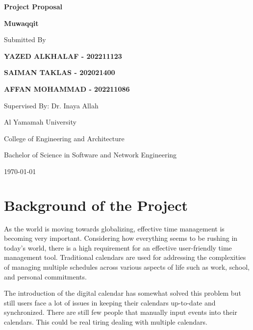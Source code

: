 \documentclass[12pt,a4paper]{article}
\begin{document}
\begin{titlepage}
\begin{center}
\vspace*{2cm}
{\huge\bfseries Project Proposal\par}
\vspace{1.5cm}
{\Large\bfseries Muwaqqit\par}
\vspace{2cm}
{\Large Submitted By\par}
\vspace{1cm}
{\Large\bfseries YAZED ALKHALAF - 202211123\par}
{\Large\bfseries SAIMAN TAKLAS - 202021400\par}
{\Large\bfseries AFFAN MOHAMMAD - 202211086\par}
\vfill
{\Large Supervised By: Dr. Inaya Allah\par}
\vspace{1cm}
{\Large Al Yamamah University\par}
{\Large College of Engineering and Architecture\par}
{\Large Bachelor of Science in Software and Network Engineering\par}
\vspace{1cm}
{\Large \today\par}
\end{center}
\end{titlepage}

\tableofcontents
\clearpage

\doublespacing

\section{Background of the Project}

As the world is moving towards globalizing, effective time management is becoming very important. Considering how everything seems to be rushing in today's world, there is a high requirement for an effective user-friendly time management tool. Traditional calendars are used for addressing the complexities of managing multiple schedules across various aspects of life such as work, school, and personal commitments.

The introduction of the digital calendar has somewhat solved this problem but still users face a lot of issues in keeping their calendars up-to-date and synchronized. There are still few people that manually input events into their calendars. This could be real tiring dealing with multiple calendars.
\end{document}
